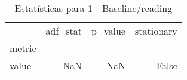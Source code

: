 \begin{table}[htbp]
\caption{Estatísticas para 1 - Baseline/reading}
\label{tab:1_-_baseline_reading_adf_test}
\begin{tabular}{lrrr}
\toprule
 & adf_stat & p_value & stationary \\
metric &  &  &  \\
\midrule
value & NaN & NaN & False \\
\bottomrule
\end{tabular}
\end{table}
